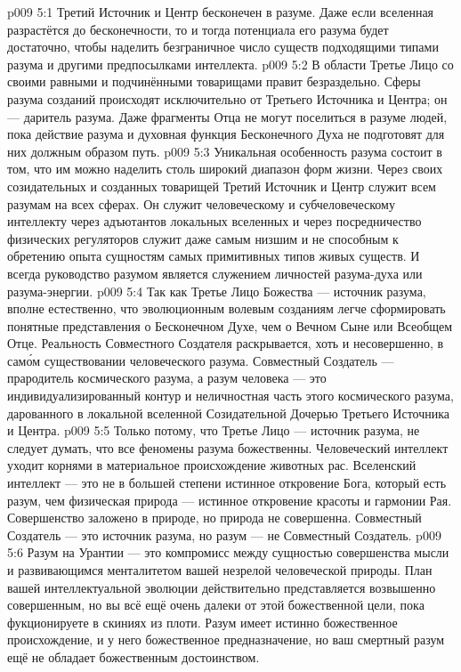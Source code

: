 \vs p009 5:1 Третий Источник и Центр бесконечен в разуме. Даже если вселенная разрастётся до бесконечности, то и тогда потенциала его разума будет достаточно, чтобы наделить безграничное число существ подходящими типами разума и другими предпосылками интеллекта.
\vs p009 5:2 В области  Третье Лицо со своими равными и подчинёнными товарищами правит безраздельно. Сферы разума созданий происходят исключительно от Третьего Источника и Центра; он --- даритель разума. Даже фрагменты Отца не могут поселиться в разуме людей, пока действие разума и духовная функция Бесконечного Духа не подготовят для них должным образом путь.
\vs p009 5:3 Уникальная особенность разума состоит в том, что им можно наделить столь широкий диапазон форм жизни. Через своих созидательных и созданных товарищей Третий Источник и Центр служит всем разумам на всех сферах. Он служит человеческому и субчеловеческому интеллекту через адъютантов локальных вселенных и через посредничество физических регуляторов служит даже самым низшим и не способным к обретению опыта сущностям самых примитивных типов живых существ. И всегда руководство разумом является служением личностей разума\hyp{}духа или разума\hyp{}энергии.
\vs p009 5:4 \pc Так как Третье Лицо Божества --- источник разума, вполне естественно, что эволюционным волевым созданиям легче сформировать понятные представления о Бесконечном Духе, чем о Вечном Сыне или Всеобщем Отце. Реальность Совместного Создателя раскрывается, хоть и несовершенно, в сам\'ом существовании человеческого разума. Совместный Создатель --- прародитель космического разума, а разум человека --- это индивидуализированный контур и неличностная часть этого космического разума, дарованного в локальной вселенной Созидательной Дочерью Третьего Источника и Центра.
\vs p009 5:5 \pc Только потому, что Третье Лицо --- источник разума, не следует думать, что все феномены разума божественны. Человеческий интеллект уходит корнями в материальное происхождение животных рас. Вселенский интеллект --- это не в большей степени истинное откровение Бога, который есть разум, чем физическая природа --- истинное откровение красоты и гармонии Рая. Совершенство заложено в природе, но природа не совершенна. Совместный Создатель --- это источник разума, но разум --- не Совместный Создатель.
\vs p009 5:6 Разум на Урантии --- это компромисс между сущностью совершенства мысли и развивающимся менталитетом вашей незрелой человеческой природы. План вашей интеллектуальной эволюции действительно представляется возвышенно совершенным, но вы всё ещё очень далеки от этой божественной цели, пока фукционируете в скиниях из плоти. Разум имеет истинно божественное происхождение, и у него божественное предназначение, но ваш смертный разум ещё не обладает божественным достоинством.
